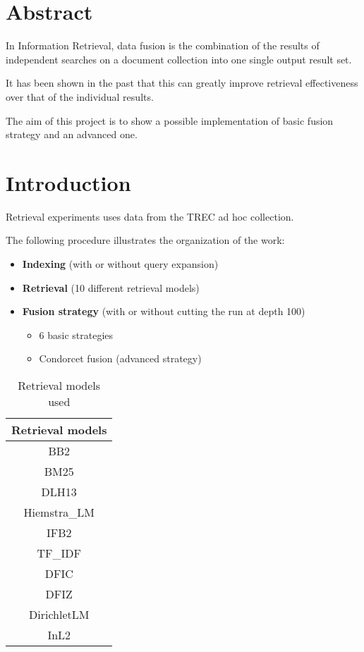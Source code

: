 


    \printTitle
    \newpage
    \tableofcontents
    \newpage
    \section{Abstract}
    In Information Retrieval, data fusion is the combination of the results
    of independent searches on a document collection into one single output
    result set.

    It has been shown in the past that this can greatly improve retrieval
    effectiveness over that of the individual results.

    The aim of this project is to show a possible implementation of basic
    fusion strategy and an advanced one.


    \section{Introduction}

    Retrieval experiments uses data from the TREC ad hoc collection.
    
    The following procedure illustrates the organization of the work:

    \begin{itemize}
        \item \textbf{Indexing} (with or without query expansion)
        \item \textbf{Retrieval} (10 different retrieval models)
        \item \textbf{Fusion strategy} (with or without cutting the run at depth 100)
            \begin{itemize}
                \item 6 basic strategies
                \item Condorcet fusion (advanced strategy)
            \end{itemize}
    \end{itemize}
    
    \begin{table}[H]
        \centering
        \begin{tabular}{c}
		\toprule
        \textbf{Retrieval models} \\ \toprule
        BB2 \\
        BM25 \\
        DLH13 \\
        Hiemstra\_LM \\
        IFB2 \\
        TF\_IDF \\
        DFIC \\
        DFIZ \\
        DirichletLM \\
        InL2 \\
        \bottomrule
        \end{tabular}
        \caption{Retrieval models used}
    \end{table}

